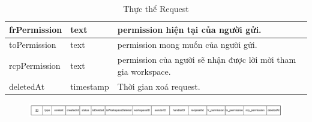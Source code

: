 \begin{center}
\begin{table}[H]
{\begin{tabular}{ |p{3cm} |p{3cm} |p{9cm}|}
                                frPermission & text & permission hiện tại của người gửi. \\
                                \hline
                                toPermission & text & permission mong muốn của người gửi. \\
                                \hline
                                rcpPermission & text & permission của người sẽ nhận được lời mời tham gia workspace. \\
                                \hline
                                deletedAt & timestamp & Thời gian xoá request. \\
                                \hline
                        \end{tabular}
                }
                \caption{Thực thể Request}
        \end{table}
\end{center}
\begin{figure}[H]
        \centering
        \includegraphics[width=\textwidth]{Content/Phân tích và thiết kế hệ thống/images/ERD_mapping/request_mapping.png}
        \label{fig:Thực thể request}
\end{figure}

